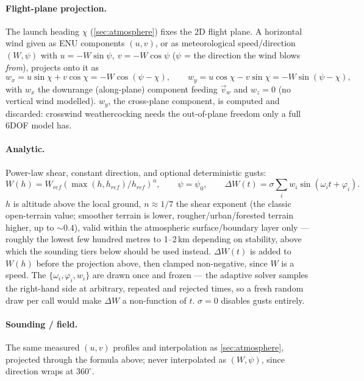\paragraph{Flight-plane projection.} The launch heading $\chi$ (\autoref{sec:atmosphere}) fixes the
2D flight plane. A horizontal wind given as ENU components $(u,v)$, or as meteorological
speed/direction $(W,\psi)$ with $u=-W\sin\psi,\ v=-W\cos\psi$ ($\psi$ = the direction the wind
blows \emph{from}), projects onto it as
\begin{equation}
    w_x = u\sin\chi + v\cos\chi = -W\cos(\psi-\chi), \qquad
    w_y = u\cos\chi - v\sin\chi = -W\sin(\psi-\chi),
\end{equation}
with $w_x$ the downrange (along-plane) component feeding $\vec{v}_w$ and $w_z=0$ (no vertical wind
modelled). $w_y$, the cross-plane component, is computed and discarded: crosswind weathercocking
needs the out-of-plane freedom only a full 6DOF model has.

\paragraph{Analytic.} Power-law shear, constant direction, and optional deterministic gusts:
\begin{equation}
    W(h) = W_{ref}\left(\max(h,h_{ref})/h_{ref}\right)^{n}, \qquad \psi = \psi_0, \qquad
    \Delta W(t) = \sigma\sum_i w_i\sin(\omega_it+\varphi_i).
\end{equation}
$h$ is altitude above the local ground, $n\approx1/7$ the shear exponent (the classic open-terrain
value; smoother terrain is lower, rougher/urban/forested terrain higher, up to $\sim0.4$), valid
within the atmospheric surface/boundary layer only --- roughly the lowest few hundred metres to
1--2\,km depending on stability, above which the sounding tiers below should be used instead.
$\Delta W(t)$ is added to $W(h)$ before the projection above, then clamped non-negative, since $W$
is a speed. The $\{\omega_i,\varphi_i,w_i\}$ are drawn once and frozen --- the adaptive solver
samples the right-hand side at arbitrary, repeated and rejected times, so a fresh random draw per
call would make $\Delta W$ a non-function of $t$. $\sigma=0$ disables gusts entirely.

\paragraph{Sounding / field.} The same measured $(u,v)$ profiles and interpolation as
\autoref{sec:atmosphere}, projected through the formula above; never interpolated as $(W,\psi)$,
since direction wraps at $360^\circ$.

